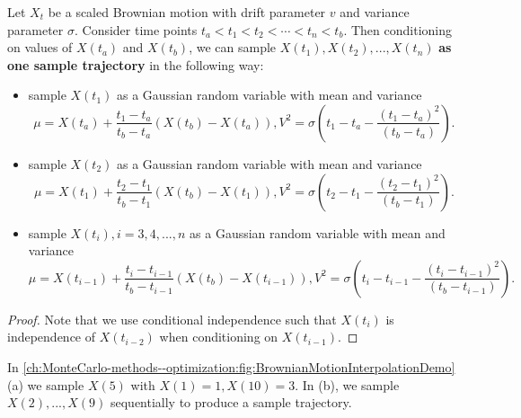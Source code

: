 \begin{refsection}
\begin{method}
Let $X_t$ be a scaled Brownian motion with drift parameter $v$ and variance parameter $\sigma$. Consider time points $t_a<t_1<t_2<\cdots < t_n<t_b$. Then conditioning on values of $X(t_a)$ and $X(t_b)$, we can sample $X(t_1),X(t_2),...,X(t_n)$ \textbf{as one sample trajectory} in the following way:
\begin{itemize}
	\item sample $X(t_1)$ as a Gaussian random variable  with mean and variance $$\mu =  X(t_a) + \frac{t_1-t_a}{t_b-t_a}(X(t_b)-X(t_a)), V^2 =\sigma( t_1-t_a - \frac{(t_1-t_a)^2}{(t_b-t_a)}).$$
	\item sample $X(t_2)$ as a Gaussian random variable  with mean and variance $$\mu =  X(t_1) + \frac{t_2-t_1}{t_b-t_1}(X(t_b)-X(t_1)), V^2 =\sigma( t_2-t_1 - \frac{(t_2-t_1)^2}{(t_b-t_1)}).$$
	\item sample $X(t_i),i=3,4,...,n$ as a Gaussian random variable  with mean and variance $$\mu =  X(t_{i-1}) + \frac{t_i-t_{i-1}}{t_b-t_{i-1}}(X(t_b)-X(t_{i-1})), V^2 = \sigma(t_i-t_{i-1} - \frac{(t_i-t_{i-1})^2}{(t_b-t_{i-1})}).$$
\end{itemize}
\end{method}
\begin{proof}
Note that we use conditional independence such that $X(t_i)$ is independence of $X(t_{i-2})$ when conditioning on $X(t_{i-1})$.
\end{proof}


\begin{example}
In \autoref{ch:MonteCarlo-methods--optimization:fig:BrownianMotionInterpolationDemo}(a) we sample $X(5)$ with $X(1) = 1, X(10) = 3$. In (b), we sample $X(2),...,X(9)$ sequentially to produce a sample trajectory.
\end{example}



\end{refsection}
